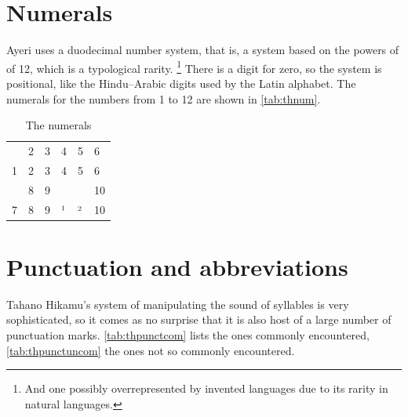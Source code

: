 \section{Numerals}

Ayeri uses a duodecimal number system, that is, a system based on the powers of
of 12, which is a typological rarity. \footnote{And one possibly
overrepresented by invented languages due to its rarity in natural languages.}
There is a digit for zero, so the system is positional, like the Hindu–Arabic
digits used by the Latin alphabet. The numerals for the numbers from 1 to 12
are shown in \autoref{tab:thnum}.

\begin{table}[t]
\caption{The numerals}

\begin{tabu} to \linewidth{X[c] X[c] X[c] X[c] X[c] X[c]}
\toprule
{} & 2 & 3 & 4 & 5 & 6 \\
\rowfont{\Tagati\huge}	1 & 2 & 3 & 4 & 5 & 6 \\

\midrule

 & 8 & 9 & \ten & \elv & 10 \\
\rowfont{\Tagati\huge}	7 & 8 & 9 & ¹ & ² & 10 \\

\bottomrule
\end{tabu}
\label{tab:thnum}
\end{table}



\section{Punctuation and abbreviations}

Tahano Hikamu's system of manipulating the sound of syllables is very 
sophisticated, so it comes as no surprise that it is also host of a large 
number of punctuation marks. \autoref{tab:thpunctcom} lists the ones commonly 
encountered, \autoref{tab:thpunctuncom} the ones not so commonly encountered.

